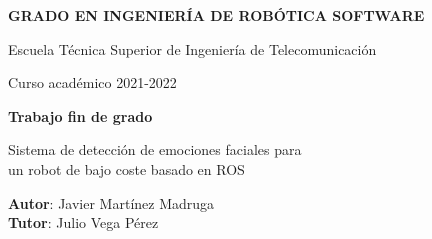 \thispagestyle{empty}
\vspace{2cm}

\begin{figure}[htb]
  \centerline{}
\end{figure}

\begin{center}
  {\Large {\bf GRADO EN INGENIERÍA DE ROBÓTICA SOFTWARE}}
  \vspace{5mm}
 
  {\large {Escuela Técnica Superior de Ingeniería de Telecomunicación}}
  \vspace{5mm}

  {\large {Curso académico 2021-2022}}

  \vspace{1cm}

  {\large {\bf Trabajo fin de grado}}

  \vspace{2cm}

  {\Large {Sistema de detección de emociones faciales para\\
               un robot de bajo coste basado en ROS\\[1cm] }}

  \vspace{5cm}
  {\bf Autor}: Javier Martínez Madruga \\
  {\bf Tutor}: Julio Vega Pérez
\end{center}

\clearpage
\thispagestyle{empty}
